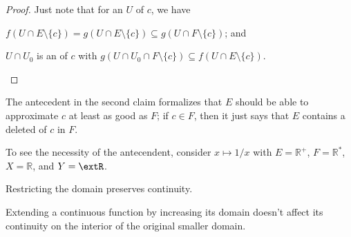 \begin{lem}
\begin{center}
		\end{center}
	\end{lem}
	
	\begin{proof}
		Just note that for an \onbd $U$ of $c$, we have
		\begin{mylist}
			\item $f(U\cap E\setminus\{c\}) = g(U\cap E\setminus\{c\})\subseteq g(U\cap F\setminus\{c\})$; and
			
			\item $U\cap U_0$ is an \onbd of $c$ with $g(U\cap U_0\cap F\setminus\{c\}) \subseteq f(U\cap E\setminus \{c\})$.
			\qedhere
		\end{mylist}
	\end{proof}
	
	\begin{rmk}
		\begin{rmklist}
			\item The antecedent in the second claim formalizes that $E$ should be able to approximate $c$ at least as good as $F$; if $c\in F$, then it just says that $E$ contains a deleted \onbd of $c$ in $F$.
		
			\item To see the necessity of the antecendent, consider $x\mapsto 1/x$ with $E = \mathbb R^+$, $F = \mathbb R^*$, $X = \mathbb R$, and $Y = \extR$.
		\end{rmklist}
	\end{rmk}
	
	\begin{cor}
		\leavevmode
		\begin{mylist}
			\item Restricting the domain preserves continuity.
		
			\item Extending a continuous function by increasing its domain doesn't affect its continuity on the interior of the original smaller domain.
		\end{mylist}
	\end{cor}
	
